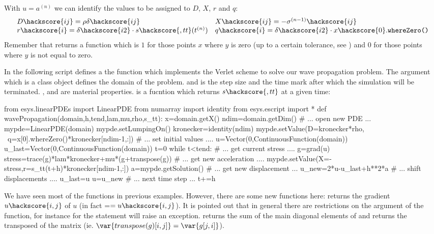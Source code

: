 With $u=a^{(n)}$ we can identify the values to be assigned to $D$, $X$, $r$ and $q$:
\begin{equation}\label{WAVE  dyn 6}
\begin{array}{ll}
D\hackscore{ij}=\rho \delta\hackscore{ij}&
X\hackscore{ij}=-\sigma^{(n-1)}\hackscore{ij} \\
r\hackscore{i}=\delta\hackscore{i2} \cdot s\hackscore{,tt}(t^{(n)}) & q\hackscore{i}=\delta\hackscore{i2}  \cdot x\hackscore{0}.\texttt{whereZero()} 
\end{array}
\end{equation}
Remember that  returns a function which is $1$ for those points $x$ where $y$ is zero
(up to a certain tolerance, see ) and $0$ for those points where $y$ is not equal to zero.
 
In the following script defines a the function  which
implements the Verlet scheme to solve our wave propagation problem. 
The argument  which is a \Domain class object
defines the domain of the problem.  and  is the step size
and the time mark after which the simulation will be terminated. ,  and 
 are material properties.  is a fucntion which returns $s\hackscore{,tt}$ at a given time: 
\begin{python}
from esys.linearPDEs import LinearPDE
from numarray import identity
from esys.escript import *
def wavePropagation(domain,h,tend,lam,mu,rho,s_tt):
   x=domain.getX()
   ndim=domain.getDim()
   # ... open new PDE ...
   mypde=LinearPDE(domain)
   mypde.setLumpingOn()
   kronecker=identity(ndim)
   mypde.setValue(D=kronecker*rho, \
                  q=x[0].whereZero()*kronecker[ndim-1,:])
   # ... set initial values ....
   u=Vector(0,ContinuousFunction(domain))
   u_last=Vector(0,ContinuousFunction(domain))
   t=0
   while t<tend:
     # ... get current stress ....
     g=grad(u)
     stress=trace(g)*lam*kronecker+mu*(g+transpose(g))
     # ... get new acceleration ....     
     mypde.setValue(X=-stress,r=s_tt(t+h)*kronecker[ndim-1,:])
     a=mypde.getSolution()
     # ... get new displacement ...
     u_new=2*u-u_last+h**2*a
     # ... shift displacements ....
     u_last=u
     u=u_new
     # ... next time step ...
     t+=h
\end{python}
We have seen most of the functions in previous examples. However,   
there are some new functions here: 
 returns the gradient $u\hackscore{i,j}$ of $u$ (in fact =$=u\hackscore{i,j}$).
It is pointed out that in general there are restrictions on the argument of the \function{grad} function, for instance
for \finley the statement \code{grad(grad(u))} will raise an exception.
\code{trace(g)} returns the sum of the main diagonal elements  of  
and \code{transpose(g)} returns the transposed of the matrix \var{g} (ie. 
$\var{transpose(g)[i,j]}=\var{g[j,i]}$). 

